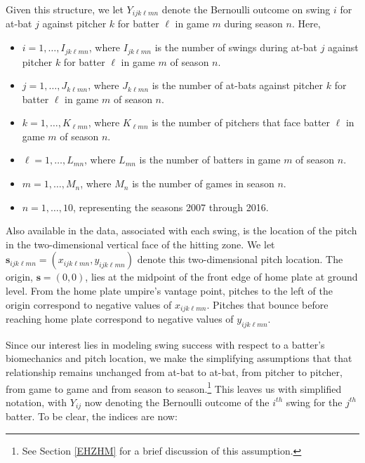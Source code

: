 Given this structure, we let $Y_{ijk\ell mn}$ denote the Bernoulli outcome on swing $i$ for at-bat $j$ against pitcher $k$ for batter $\ell$ in game $m$ during season $n$. Here,

\begin{itemize}

\item $i = 1,\ldots,I_{jk\ell mn}$, where $I_{jk\ell mn}$ is the number of swings during at-bat $j$ against pitcher $k$ for batter $\ell$ in game $m$ of season $n$.

\item $j = 1,\ldots,J_{k\ell mn}$, where $J_{k\ell mn}$ is the number of at-bats against pitcher $k$ for batter $\ell$ in game $m$ of season $n$.

\item $k = 1,\ldots,K_{\ell mn}$, where $K_{\ell mn}$ is the number of pitchers that face batter $\ell$ in game $m$ of season $n$.

\item $\ell = 1,\ldots,L_{mn}$, where $L_{mn}$ is the number of batters in game $m$ of season $n$.

\item $m = 1,\ldots,M_n$, where $M_n$ is the number of games in season $n$.

\item $n = 1,\ldots,10$, representing the seasons 2007 through 2016.

\end{itemize}

Also available in the data, associated with each swing, is the location of the pitch in the two-dimensional vertical face of the hitting zone. We let $\mathbf{s}_{ijk\ell mn} = (x_{ijk\ell mn},y_{ijk\ell mn})$ denote this two-dimensional pitch location. The origin, $\mathbf{s} = (0,0)$, lies at the midpoint of the front edge of home plate at ground level. From the home plate umpire's vantage point, pitches to the left of the origin correspond to negative values of $x_{ijk\ell mn}$. Pitches that bounce before reaching home plate correspond to negative values of $y_{ijk\ell mn}$.

Since our interest lies in modeling swing success with respect to a batter's biomechanics and pitch location, we make the simplifying assumptions that that relationship remains unchanged from at-bat to at-bat, from pitcher to pitcher, from game to game and from season to season.\footnote{See Section \ref{EHZHM} for a brief discussion of this assumption.} This leaves us with simplified notation, with $Y_{ij}$ now denoting the Bernoulli outcome of the $i^{th}$ swing for the $j^{th}$ batter. To be clear, the indices are now:

